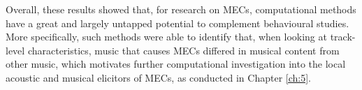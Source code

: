 Overall, these results showed that, for research on MECs, computational methods have a great and largely untapped potential to complement behavioural studies. More specifically, such methods were able to identify that, when looking at track-level characteristics, music that causes MECs differed in musical content from other music, which motivates further computational investigation into the local acoustic and musical elicitors of MECs, as conducted in Chapter \ref{ch:5}.
